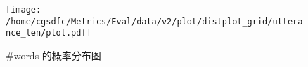 \begin{figure}[H]%
\centering%
\texttt{[image: /home/cgsdfc/Metrics/Eval/data/v2/plot/distplot\_grid/utterance\_len/plot.pdf]}%
\caption{\#words 的概率分布图}%
\label{fig:wordsdist}%
\end{figure}